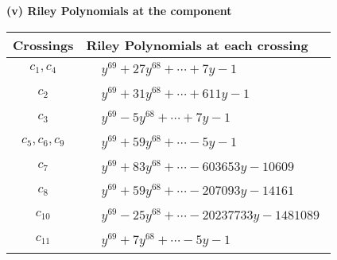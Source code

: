 \documentclass[1p]{elsarticle_modified}
\theoremstyle{definition}
\begin{document}
\newpage\renewcommand{\arraystretch}{1}
\flushleft \textbf{(v) Riley Polynomials at the component}\newline \\
\begin{tabular}{m{50pt}|m{274pt}}
Crossings & \hspace{64pt}Riley Polynomials at each crossing \\
\hline $$\begin{aligned}c_{1},c_{4}\end{aligned}$$&$\begin{aligned}
&y^{69}+27 y^{68}+\cdots+7 y-1
\end{aligned}$\\
\hline $$\begin{aligned}c_{2}\end{aligned}$$&$\begin{aligned}
&y^{69}+31 y^{68}+\cdots+611 y-1
\end{aligned}$\\
\hline $$\begin{aligned}c_{3}\end{aligned}$$&$\begin{aligned}
&y^{69}-5 y^{68}+\cdots+7 y-1
\end{aligned}$\\
\hline $$\begin{aligned}c_{5},c_{6},c_{9}\end{aligned}$$&$\begin{aligned}
&y^{69}+59 y^{68}+\cdots-5 y-1
\end{aligned}$\\
\hline $$\begin{aligned}c_{7}\end{aligned}$$&$\begin{aligned}
&y^{69}+83 y^{68}+\cdots-603653 y-10609
\end{aligned}$\\
\hline $$\begin{aligned}c_{8}\end{aligned}$$&$\begin{aligned}
&y^{69}+59 y^{68}+\cdots-207093 y-14161
\end{aligned}$\\
\hline $$\begin{aligned}c_{10}\end{aligned}$$&$\begin{aligned}
&y^{69}-25 y^{68}+\cdots-20237733 y-1481089
\end{aligned}$\\
\hline $$\begin{aligned}c_{11}\end{aligned}$$&$\begin{aligned}
&y^{69}+7 y^{68}+\cdots-5 y-1
\end{aligned}$\\
\hline
\end{tabular}\\~\\
\end{document}
